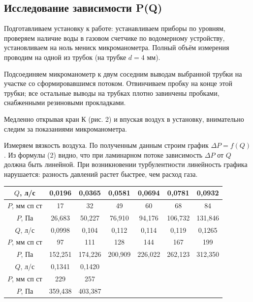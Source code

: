 \documentclass[a4paper, 12pt]{article} %
\begin{document}
\subsection{Исследование зависимости P(Q)}

Подготавливаем установку к работе: устанавливаем приборы по уровням, проверяем наличие воды в газовом счетчике по водомерному устройству, установливаем на ноль мениск микроманометра. Полный объём измерения проводим на одной из трубок (на трубке $d = 4$ мм).

Подсоединяем микроманометр к двум соседним выводам выбранной трубки на участке со сформировавшимся потоком. Отвинчиваем пробку на конце этой трубки; все остальные выводы на трубках плотно завинчены пробками, снабженными резиновыми прокладками.

Медленно открывая кран К (рис. 2) и впуская воздух в установку, внимательно следим за показаниями микроманометра.

Измеряем вязкость воздуха. По полученным данным строим график $\Delta P = f(Q)$. Из формулы (2) видно, что при ламинарном потоке зависимость $\Delta P$ от $Q$ должна быть линейной. При возникновении турбулентности линейность графика нарушается: разность давлений растет быстрее, чем расход газа.

\begin{table}[!h]
\begin{tabular}{|c|c|c|c|c|c|c|}
\hline
$Q$, л/с      & 0,0196   & 0,0365   & 0,0581                & 0,0694                & 0,0781               & 0,0932                \\ \hline
$P$, мм сп ст & 17       & 32       & 49                    & 60                    & 68                    & 84                    \\ \hline
$P$, Па       & 26,683  & 50,227  & 76,910               & 94,176   & 106,732              & 131,846              \\ \hline
$Q$, л/с      & 0,0998   & 0,104    & 0,112                 & 0,114                 & 0,119                 & 0,1265                \\ \hline
$P$, мм сп ст & 97       & 111      & 128                   & 144                   & 167                   & 199                   \\ \hline
$P$, Па       & 152,251 & 174,226 & 200,909              & 226,022 & 262,123              & 312,350              \\ \hline
$Q$, л/с      & 0,1341    & 0,1420    & \multicolumn{1}{l|}{} & \multicolumn{1}{l|}{} & \multicolumn{1}{l|}{} & \multicolumn{1}{l|}{} \\ \hline
$P$, мм сп ст & 229      & 257      & \multicolumn{1}{l|}{} & \multicolumn{1}{l|}{} & \multicolumn{1}{l|}{} & \multicolumn{1}{l|}{} \\ \hline
$P$, Па       & 359,438 & 403,387 & \multicolumn{1}{l|}{} & \multicolumn{1}{l|}{} & \multicolumn{1}{l|}{} & \multicolumn{1}{l|}{} \\ \hline
\end{tabular}
\end{table}
\end{document}
